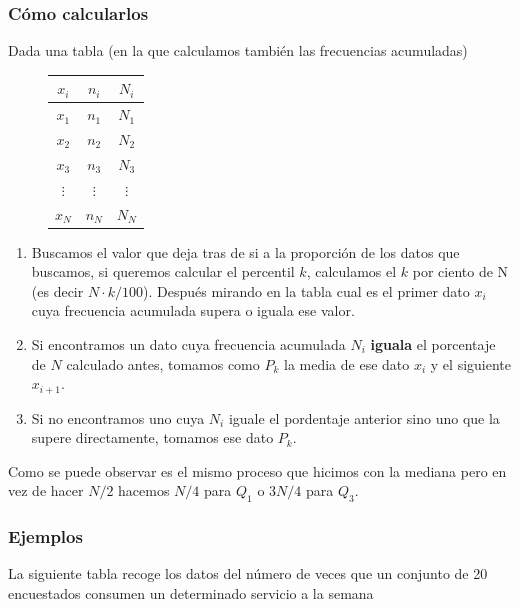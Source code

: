 \documentclass[]{article}
\providecommand{\tightlist}{%
  \setlength{\itemsep}{0pt}\setlength{\parskip}{0pt}}
\theoremstyle{plain}
\theoremstyle{definition}
\theoremstyle{definition} %
\begin{document}
\newpage
\hypertarget{cuxf3mo-calcularlos}{%
\subsubsection{Cómo calcularlos}\label{cuxf3mo-calcularlos}}

Dada una tabla (en la que calculamos también las frecuencias acumuladas)

\begin{figure}
  \centering
\begin{tabular}{ccc}
\(x_i\) & \(n_i\) & \(N_i\)\\
\hline
\(x_1\) & \(n_1\) & \(N_1\)         \\
\(x_2\) & \(n_2\) & \(N_2\)         \\
\(x_3\) & \(n_3\) & \(N_3\)         \\
\(\vdots\) & \(\vdots\) & \(\vdots\)\\
\(x_N\) & \(n_N\) & \(N_N\)
\end{tabular}
\end{figure}

\begin{enumerate}
\def\labelenumi{\arabic{enumi}.}
\tightlist
\item
  Buscamos el valor que deja tras de si a la proporción de los datos que
  buscamos, si queremos calcular el percentil \(k\), calculamos el \(k\)
  por ciento de N (es decir \(N\cdot k /100\)). Después mirando en la
  tabla cual es el primer dato \(x_i\) cuya frecuencia acumulada supera
  o iguala ese valor.
\item
  Si encontramos un dato cuya frecuencia acumulada \(N_i\)
  \textbf{iguala} el porcentaje de \(N\) calculado antes, tomamos como
  \(P_k\) la media de ese dato \(x_i\) y el siguiente \(x_{i+1}\).
\item
  Si no encontramos uno cuya \(N_i\) iguale el pordentaje anterior sino
  uno que la supere directamente, tomamos ese dato \(P_k\).
\end{enumerate}

Como se puede observar es el mismo proceso que hicimos con la mediana
pero en vez de hacer \(N/2\) hacemos \(N/4\) para \(Q_1\) o \(3N/4\)
para \(Q_3\).

\hypertarget{ejemplos-1}{%
\subsubsection{Ejemplos}\label{ejemplos-1}}

La siguiente tabla recoge los datos del número de veces que un conjunto
de 20 encuestados consumen un determinado servicio a la semana
\end{document}
